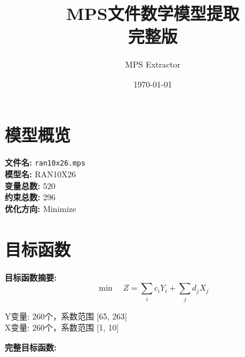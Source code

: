 \documentclass[a4paper,10pt]{article}
\title{MPS文件数学模型提取\\{\large 完整版}}
\author{MPS Extractor}
\date{\today}
\begin{document}
\maketitle
\tableofcontents
\newpage

\section{模型概览}

\textbf{文件名:} \texttt{ran10x26.mps} \\
\textbf{模型名:} RAN10X26 \\
\textbf{变量总数:} 520 \\
\textbf{约束总数:} 296 \\
\textbf{优化方向:} Minimize \\

\section{目标函数}

\textbf{目标函数摘要:}
\begin{equation}
\min \quad Z = \sum_{i} c_i Y_i + \sum_{j} d_j X_j
\end{equation}

Y变量: 260个，系数范围 [65, 263] \\
X变量: 260个，系数范围 [1, 10]

\textbf{完整目标函数:}
\end{document}
